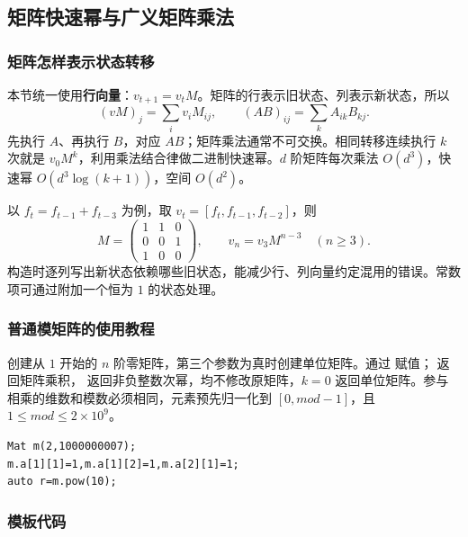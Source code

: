 \subsection{矩阵快速幂与广义矩阵乘法}
\label{algo:matrix}
\subsubsection*{矩阵怎样表示状态转移}
本节统一使用\textbf{行向量}：$v_{t+1}=v_tM$。矩阵的行表示旧状态、列表示新状态，所以
\[
    (vM)_j=\sum_i v_iM_{ij},\qquad
    (AB)_{ij}=\sum_k A_{ik}B_{kj}.
\]
先执行 $A$、再执行 $B$，对应 $AB$；矩阵乘法通常不可交换。相同转移连续执行 $k$ 次就是 $v_0M^k$，利用乘法结合律做二进制快速幂。$d$ 阶矩阵每次乘法 $O(d^3)$，快速幂 $O(d^3\log(k+1))$，空间 $O(d^2)$。

以 $f_t=f_{t-1}+f_{t-3}$ 为例，取 $v_t=[f_t,f_{t-1},f_{t-2}]$，则
\[
    M=\begin{pmatrix}1&1&0\\0&0&1\\1&0&0\end{pmatrix},
    \qquad v_n=v_3M^{n-3}\quad(n\geq3).
\]
构造时逐列写出新状态依赖哪些旧状态，能减少行、列向量约定混用的错误。常数项可通过附加一个恒为 $1$ 的状态处理。

\subsubsection*{普通模矩阵的使用教程}
 创建从 $1$ 开始的 $n$ 阶零矩阵，第三个参数为真时创建单位矩阵。通过  赋值； 返回矩阵乘积， 返回非负整数次幂，均不修改原矩阵，$k=0$ 返回单位矩阵。参与相乘的维数和模数必须相同，元素预先归一化到 $[0,mod-1]$，且 $1\leq mod\leq2\times10^9$。
\begin{lstlisting}[style=mtycpp,numbers=none]
Mat m(2,1000000007);
m.a[1][1]=1,m.a[1][2]=1,m.a[2][1]=1;
auto r=m.pow(10);
\end{lstlisting}

\subsubsection*{模板代码}

